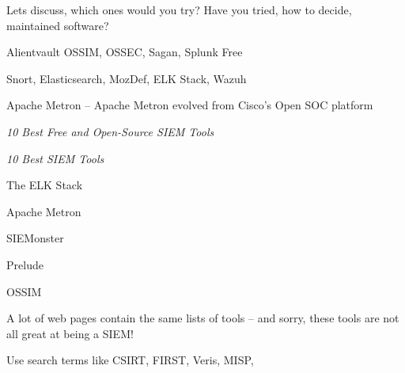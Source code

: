 \documentclass[Screen16to9,17pt]{foils}
\begin{document}
\centerline{Lets discuss, which ones would you try? Have you tried, how to decide, maintained software?}


\begin{list2}
\item Alientvault OSSIM, OSSEC, Sagan, Splunk Free
\item Snort, Elasticsearch, MozDef, ELK Stack, Wazuh
\item Apache Metron -- Apache Metron evolved from Cisco’s Open SOC platform
\end{list2}

\emph{10 Best Free and Open-Source SIEM Tools} 

\emph{10 Best SIEM Tools} 

\begin{list2}
\item The ELK Stack
\item Apache Metron
\item SIEMonster
\item Prelude
\item OSSIM
\end{list2}
A lot of web pages contain the same lists of tools -- and sorry, these tools are not all great at being a SIEM!




\begin{quote}

\end{quote}

\begin{list2}
  \item Use search terms like CSIRT, FIRST, Veris, MISP,
\end{list2}





\end{document}
